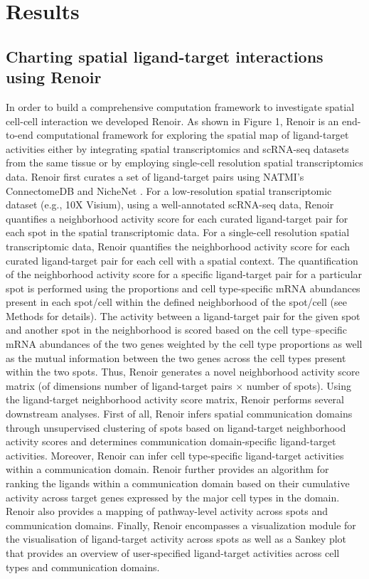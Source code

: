 \section*{Results}\label{section: result}
\subsection*{Charting spatial ligand-target interactions using Renoir}

In order to build a comprehensive computation framework to investigate spatial cell-cell interaction we developed Renoir. As shown in Figure 1, Renoir is an end-to-end computational framework for exploring the spatial map of ligand-target activities either by integrating spatial transcriptomics and scRNA-seq datasets from the same tissue or by employing single-cell resolution spatial transcriptomics data. Renoir first curates a set of ligand-target pairs using NATMI's ConnectomeDB \citep{Hou2020} and NicheNet \citep{Browaeys2020}. For a low-resolution spatial transcriptomic dataset (e.g., 10X Visium), using a well-annotated scRNA-seq data, Renoir quantifies a neighborhood activity score for each curated ligand-target pair for each spot in the spatial transcriptomic data. For a single-cell resolution spatial transcriptomic data, Renoir quantifies the neighborhood activity score for each curated ligand-target pair for each cell with a spatial context. The quantification of the neighborhood activity score for a specific ligand-target pair for a particular spot is performed using the proportions and cell type-specific mRNA abundances present in each spot/cell within the defined neighborhood of the spot/cell (see Methods for details). The activity between a ligand-target pair for the given spot and another spot in the neighborhood is scored based on the cell type–specific mRNA abundances of the two genes weighted by the cell type proportions as well as the mutual information between the two genes across the cell types present within the two spots. Thus, Renoir generates a novel neighborhood activity score matrix (of dimensions number of ligand-target pairs $\times$ number of spots). Using the ligand-target neighborhood activity score matrix, Renoir performs several downstream analyses. First of all, Renoir infers spatial communication domains through unsupervised clustering of spots based on ligand-target neighborhood activity scores and determines communication domain-specific ligand-target activities. Moreover, Renoir can infer cell type-specific ligand-target activities within a communication domain. Renoir further provides an algorithm for ranking the ligands within a communication domain based on their cumulative activity across target genes expressed by the major cell types in the domain. Renoir also provides a mapping of pathway-level activity across spots and communication domains. Finally, Renoir encompasses a visualization module for the visualisation of ligand-target activity across spots as well as a Sankey plot that provides an overview of user-specified ligand-target activities across cell types and communication domains.

